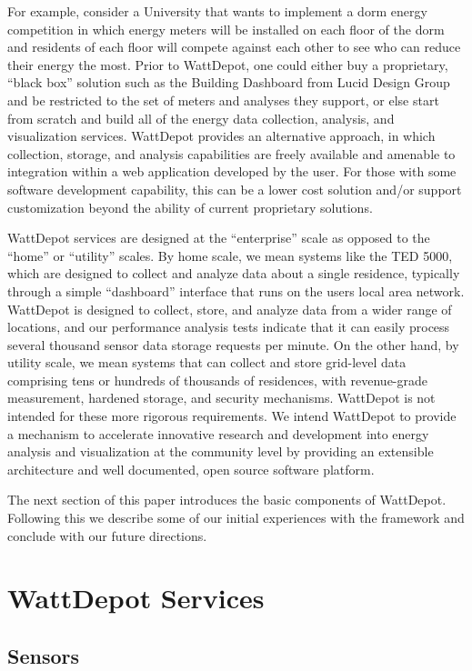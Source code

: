 \documentclass[conference,compsoc]{IEEEtran}
\begin{document}
For example, consider a University that wants to implement a dorm energy
competition in which energy meters will be installed on each floor of the
dorm and residents of each floor will compete against each other to see who
can reduce their energy the most.  Prior to WattDepot, one could either buy a
proprietary, ``black box'' solution such as the Building Dashboard from
Lucid Design Group and be restricted to the set of meters and analyses they
support, or else start from scratch and build all of the energy data
collection, analysis, and visualization services.  WattDepot provides an
alternative approach, in which collection, storage, and analysis
capabilities are freely available and amenable to integration within a web
application developed by the user.  For those with some software
development capability, this can be a lower cost solution and/or support
customization beyond the ability of current proprietary solutions.

WattDepot services are designed at the ``enterprise'' scale as opposed to
the ``home'' or ``utility'' scales.  By home scale, we mean systems like
the TED 5000, which are designed to collect and analyze data about a single
residence, typically through a simple ``dashboard'' interface that runs on
the users local area network.  WattDepot is designed to collect, store, and
analyze data from a wider range of locations, and our performance analysis
tests indicate that it can easily process several thousand sensor data
storage requests per minute.  On the other hand, by utility scale, we mean
systems that can collect and store grid-level data comprising tens or
hundreds of thousands of residences, with revenue-grade measurement,
hardened storage, and security mechanisms.  WattDepot is not intended for
these more rigorous requirements.  We intend WattDepot to provide a
mechanism to accelerate innovative research and development into energy
analysis and visualization at the community level by providing an
extensible architecture and well documented, open source software platform.

The next section of this paper introduces the basic components of
WattDepot. Following this we describe some of our initial experiences with
the framework and conclude with our future directions. 

\section{WattDepot Services}

\subsection{Sensors}
\end{document}
